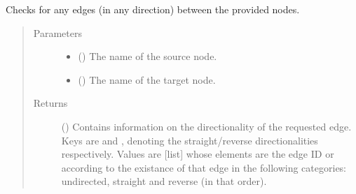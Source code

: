 \documentclass[letterpaper,10pt,english]{sphinxmanual}
\begin{document}
\begin{fulllineitems}
\begin{fulllineitems}
\begin{quote}
\begin{description}
\begin{itemize}
\end{itemize}

\end{description}\end{quote}

\end{fulllineitems}


\begin{fulllineitems}
\label{\detokenize{main:pypath.main.PyPath.affects}}
\end{fulllineitems}


\begin{fulllineitems}
\label{\detokenize{main:pypath.main.PyPath.all_between}}
Checks for any edges (in any direction) between the provided
nodes.
\begin{quote}\begin{description}
\item[{Parameters}] \leavevmode\begin{itemize}
\item {} 
 () \textendash{} The name of the source node.

\item {} 
 () \textendash{} The name of the target node.

\end{itemize}

\item[{Returns}] \leavevmode
() \textendash{} Contains information on the directionality of
the requested edge. Keys are  and , denoting
the straight/reverse directionalities respectively. Values
are {[}list{]} whose elements are the edge ID or 
according to the existance of that edge in the following
categories: undirected, straight and reverse (in that
order).

\end{description}\end{quote}


\end{fulllineitems}
\end{fulllineitems}
\end{document}
